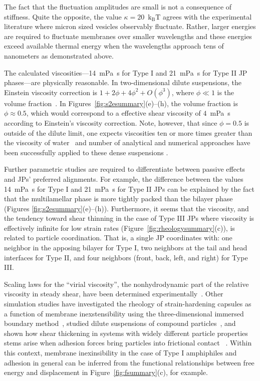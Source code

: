 \documentclass[prb,preprint,showpacs,preprintnumbers,amsmath,amssymb,longbibliography]{revtex4-2}
\newcommand{\kbt}{\mathrm{k}_{\text{B}}\mathrm{T}}
\begin{document}
The fact that the fluctuation amplitudes are small is not a consequence
of stiffness. Quite the opposite, the value $\kappa = 20$~$\kbt$ agrees
with the experimental literature where micron sized vesicles observably
fluctuate. Rather, larger energies are required to fluctuate membranes
over smaller wavelengths and these energies exceed available thermal
energy when the wavelengths approach tens of nanometers as demonstrated
above.

The calculated viscosities---14~mPa~s for Type I and 21~mPa~s for Type
II JP phases---are physically reasonable. In two-dimensional dilute
suspensions, the Einstein viscosity correction is $1 + 2 \phi + 4\phi^2
+ O(\phi^3)$, where $\phi \ll 1$ is the volume
fraction~\cite{PhysRevFluids.1.043301, Haines2011APO, Khair2006TheC,
Brady1983TheEV}. In Figures~\ref{fig:s2esummary}(e)--(h), the volume
fraction is $\phi \approx 0.5$, which would correspond to a effective
shear viscosity of $4$~mPa~s according to Einstein's viscosity
correction. Note, however, that since $\phi = 0.5$ is outside of the
dilute limit, one expects viscosities ten or more times greater than the
viscosity of water~\cite{Konijn2014ExperimentalSO}
and number of analytical and numerical
approaches have been successfully applied to these dense suspensions
\citep{Guazzelli2018RheologyOD}.

Further parametric studies are required to differentiate
between passive effects and JPs' preferred alignments. 
For example, the difference between the values 14~mPa~s for Type I and
21~mPa~s for Type II JPs can be explained by the fact that the
multilamellar phase is more tightly packed than the bilayer phase
(Figures \ref{fig:s2esummary}(e)--(h)). Furthermore, it seems that the
viscosity, and the tendency toward shear thinning in the case of Type
III JPs where viscosity is effectively infinite for low strain rates
(Figure~\ref{fig:rheologysummary}(c)), is related to particle
coordination. That is, a single JP coordinates with: one
neighbor in the apposing bilayer for Type I, two neighbors at the tail
and head interfaces for Type II, and four neighbors (front, back, left,
and right) for Type III.

Scaling laws for the ``virial viscosity'', the nonhydrodynamic part of the
relative viscosity in steady shear, have 
been determined experimentally~\citep{PhysRevFluids.5.053302}. 
Other simulation studies have investigated the rheology of strain-hardening
capsules as a function of membrane inexstensibility
using the three-dimensional immersed boundary method~\cite{aouane_scagliarini_harting_2021},
studied dilute suspensions of compound particles~\cite{singeetham_chaithanya_thampi_2021},
and shown how shear
thickening in systems with widely different particle properties stems 
arise when adhesion forces bring particles into frictional contact
~\cite{PhysRevFluids.7.054302}. Within this context, membrane inexinsibility
in the case of Type I amphiphiles and adhesion in general 
can be inferred from the functional relationships between free energy
and displacement in Figure~\ref{fig:fsummary}(c), for example.
\end{document}

